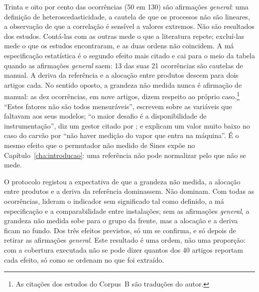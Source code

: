 Trinta e oito por cento das ocorrências (50 em 130) são afirmações \emph{general}:
uma definição de heteroscedasticidade, a cautela de que os processos não são
lineares, a observação de que a correlação é sensível a valores extremos. Não
são resultados dos estudos. Contá-las com as outras mede o que a literatura
repete; excluí-las mede o que os estudos encontraram, e as duas ordens não
coincidem. A má especificação estatística é o segundo efeito mais citado e
cai para o meio da tabela quando as afirmações \emph{general} saem: 13 das
suas 21 ocorrências são cautelas de manual. A deriva da referência e a
alocação entre produtos descem para dois artigos cada. No sentido oposto,
a grandeza não medida nunca é afirmação de manual: as dez ocorrências, em
nove artigos, dizem respeito ao próprio caso.\footnote{As citações dos
estudos do Corpus~B são traduções do autor.} ``Estes fatores não são todos
mensuráveis'', escrevem \textcite{Hamedi2019} sobre as variáveis que
faltavam aos seus modelos; ``o maior desafio é a disponibilidade de
instrumentação'', diz um gestor citado por \textcite{Sivill2013}; e
\textcite{EspinelBlanco2020} explicam um valor muito baixo no caso do carvão
por ``não haver medição do vapor que entra na máquina''. É o mesmo efeito
que o permutador não medido de Sines expõe no Capítulo~\ref{cha:introducao}:
uma referência não pode normalizar pelo que não se mede.

O protocolo registou a expectativa de que a grandeza não medida, a alocação
entre produtos e a deriva da referência dominassem. Não dominam. Com todas as
ocorrências, lideram o indicador sem significado tal como definido, a má
especificação e a comparabilidade entre instalações; sem as afirmações
\emph{general}, a grandeza não medida sobe para o grupo da frente, mas a
alocação e a deriva ficam no fundo. Dos três efeitos previstos, só um
se confirma, e só depois de retirar as afirmações \emph{general}.
Este resultado é uma ordem, não uma proporção: com a cobertura executada
não se pode dizer quantos dos 40 artigos reportam cada efeito, só como se
ordenam no que foi extraído.

